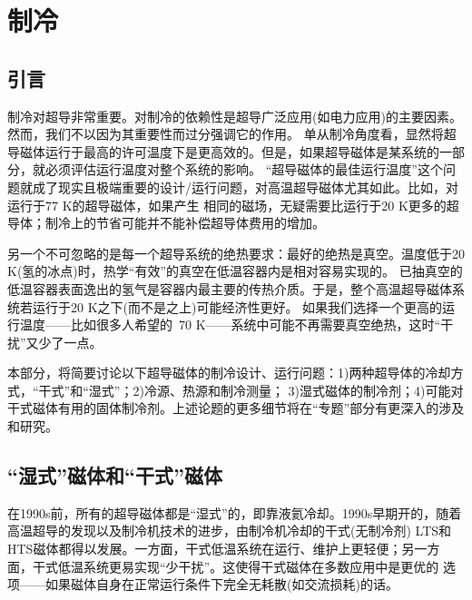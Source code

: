 \chapter{制冷}
\section{引言}
制冷对超导非常重要。对制冷的依赖性是超导广泛应用(如电力应用)的主要因素。然而，我们不以因为其重要性而过分强调它的作用。
单从制冷角度看，显然将超导磁体运行于最高的许可温度下是更高效的。但是，如果超导磁体是某系统的一部分，就必须评估运行温度对整个系统的影响。
“超导磁体的最佳运行温度”这个问题就成了现实且极端重要的设计/运行问题，对高温超导磁体尤其如此。比如，对运行于77 K的超导磁体，如果产生
相同的磁场，无疑需要比运行于20 K更多的超导体；制冷上的节省可能并不能补偿超导体费用的增加。

另一个不可忽略的是每一个超导系统的绝热要求：最好的绝热是真空。温度低于20 K(氢的冰点)时，热学“有效”的真空在低温容器内是相对容易实现的。
已抽真空的低温容器表面逸出的氢气是容器内最主要的传热介质。于是，整个高温超导磁体系统若运行于20 K之下(而不是之上)可能经济性更好。
如果我们选择一个更高的运行温度——比如很多人希望的~70 K——系统中可能不再需要真空绝热，这时“干扰”又少了一点。

本部分，将简要讨论以下超导磁体的制冷设计、运行问题：1)两种超导体的冷却方式，“干式”和“湿式”；2)冷源、热源和制冷测量；
3)湿式磁体的制冷剂；4)可能对干式磁体有用的固体制冷剂。上述论题的更多细节将在“专题”部分有更深入的涉及和研究。

\section{“湿式”磁体和“干式”磁体}
在1990s前，所有的超导磁体都是“湿式”的，即靠液氦冷却。1990s早期开的，随着高温超导的发现以及制冷机技术的进步，由制冷机冷却的干式(无制冷剂)
LTS和HTS磁体都得以发展。一方面，干式低温系统在运行、维护上更轻便；另一方面，干式低温系统更易实现“少干扰”。这使得干式磁体在多数应用中是更优的
选项——如果磁体自身在正常运行条件下完全无耗散(如交流损耗)的话。

